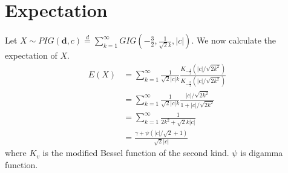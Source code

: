 \documentclass[11pt, oneside]{article}
\newcommand{\dd}{\mathbf{d}}
\begin{document}
\section{Expectation}
Let $X\sim PIG(\dd, c) \overset{d}{=} \sum_{k=1}^\infty GIG\left(-\frac{3}{2}, \frac{1}{\sqrt{2}k}, |c|\right)$. We now calculate the expectation of $X$.
\begin{align*}
E(X) &= \sum_{k=1}^\infty \frac{1}{\sqrt{2}|c|k}\frac{K_{-\frac{1}{2}}(|c|/\sqrt{2k^2})}{K_{-\frac{3}{2}}(|c|/\sqrt{2k^2})}\\
&= \sum_{k=1}^\infty \frac{1}{\sqrt{2}|c|k} \frac{|c|/\sqrt{2k^2}}{1 + |c|/\sqrt{2k^2}} \\
&= \sum_{k=1}^\infty \frac{1}{2k^2 + \sqrt{2}k|c|} \\
&= \frac{\gamma + \psi(|c|/\sqrt{2} + 1)}{\sqrt{2}|c|}
\end{align*}
where $K_v$ is the modified Bessel function of the second kind. $\psi$ is digamma function.
\end{document}
